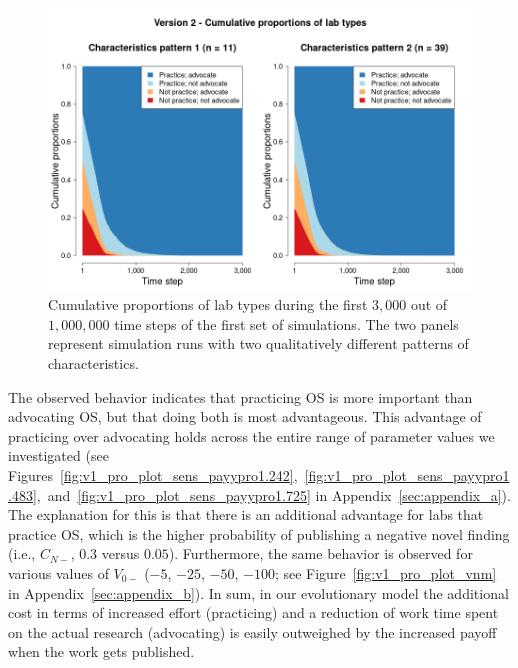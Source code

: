 \documentclass[meta, authordate,issue]{jote-new-article}
\begin{document}
\begin{figure}[!t]
  \begin{fullwidth}

    \centering
    \includegraphics[width=\textwidth]{v2_pro_plot_main.png}
    \caption{Cumulative proportions of lab types during the first $3,000$ out of $1,000,000$ time steps of the first set of simulations. The two panels represent simulation runs with two qualitatively different patterns of characteristics.}
    \label{fig:v2_pro_plot_main}
  \end{fullwidth}
\end{figure}
%

The observed behavior indicates that practicing OS is more important than advocating OS, but that doing both is most advantageous. This advantage of practicing over advocating holds across the entire range of parameter values we investigated (see Figures~\ref{fig:v1_pro_plot_sens_payypro1.242},~\ref{fig:v1_pro_plot_sens_payypro1.483},~and~\ref{fig:v1_pro_plot_sens_payypro1.725} in Appendix~\ref{sec:appendix_a}). The explanation for this is that there is an additional advantage for labs that practice OS, which is the higher probability of publishing a negative novel finding (i.e., $C_{N-}$, $0.3$ versus $0.05$). Furthermore, the same behavior is observed for various values of $V_{0-}$ ($-5$, $-25$, $-50$, $-100$; see Figure~\ref{fig:v1_pro_plot_vnm} in Appendix~\ref{sec:appendix_b}). In sum, in our evolutionary model the additional cost in terms of increased effort (practicing) and a reduction of work time spent on the actual research (advocating) is easily outweighed by the increased payoff when the work gets published.
\end{document}
